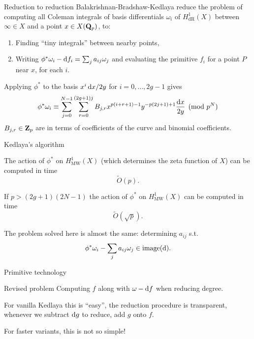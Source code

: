\begin{frame}{Reduction to reduction}
    Balakrishnan-Bradshaw-Kedlaya reduce the problem of computing all Coleman integrals of basis differentials \(\omega_i\) of \(H^1_{\mathrm{dR}}(X)\) between \(\infty\in X\) and a point \(x\in X(\mathbf{Q}_p)\), to:
    \begin{enumerate}
        \item Finding ``tiny integrals'' between nearby points,
        \item Writing \(\phi^*\omega_i  - \mathop{}\!\mathrm{d} f_i=\sum_j a_{ij}\omega_j \) and evaluating the primitive \(f_i\) for a point \(P\) near \(x\), for each \(i\).
    \end{enumerate}
    \pause%
    Applying \(\phi^*\) to the basis \(x^i \mathop{}\!\mathrm{d} x/2y\) for \(i = 0,\ldots, 2g-1\) gives
    \[\phi^* \omega_i \equiv\sum_{j=0}^{N-1} \sum_{r=0}^{(2g+1)j} B_{j,r} x^{p(i+r+1) - 1}y^{-p(2j+1) + 1} \frac{\mathop{}\!\mathrm{d} x}{2y}\pmod{p^N}\]
    \(B_{j,r}\in \mathbf{Z}_p\) are in terms of coefficients of the curve and binomial coefficients.

\end{frame}

\begin{frame}{Kedlaya's algorithm}
    \begin{theorem}[Kedlaya]
        The action of \(\phi^*\) on \(H^1_{\mathrm{MW}}(X)\) (which determines the zeta function of \(X\)) can be computed in time
        \[
            \widetilde O(p)\text{.}
        \]
    \end{theorem}

    \pause%

    \begin{theorem}[Harvey]
        If \(p \gt (2g+1)(2N-1)\) the action of \(\phi^*\) on \(H^1_{\mathrm{MW}}(X)\) can be computed in time
        \[
            \widetilde O(\sqrt{p})\text{.}
        \]
    \end{theorem}

    \pause%

    The problem solved here is almost the same: determining \(a_{ij}\) s.t. \[\phi^* \omega_i -  \sum_j a_{ij}\omega_j \in \operatorname{image} (\mathop{}\!\mathrm{d})\text{.}\]
\end{frame}


\begin{frame}{Primitive technology}
    \begin{block}{Revised problem}
        Computing \(f\) along with \(\omega - \mathop{}\!\mathrm{d} f\) when reducing degree.
    \end{block}

    For vanilla Kedlaya this is ``easy'', the reduction procedure is transparent, whenever we subtract \(\mathop{}\!\mathrm{d} g\) to reduce, add \(g\) onto \(f\).

    For faster variants, this is not so simple!
\end{frame}

